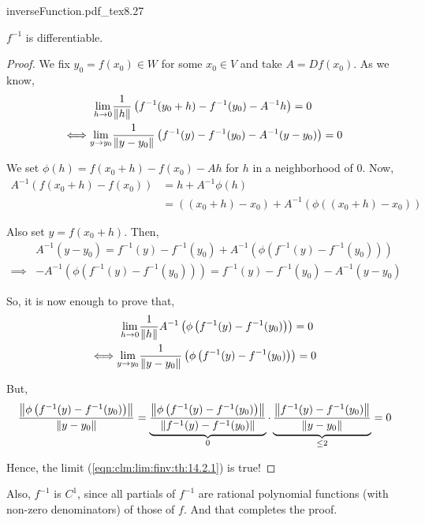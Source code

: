 \documentclass[../Analysis-3.tex]{subfiles}
\begin{document}
\begin{proofFig}{\def\svgwidth{1.4in}
    {inverseFunction.pdf_tex}}{}{\label{fig:inf:fun}}{8}{.27\textwidth}
  \begin{clmBox}
    $ f^{-1} $ is differentiable.
  \end{clmBox}

  \begin{proof}
    We fix $ y_0 = f(x_0) \in W $ for some $ x_0 \in V $ and take $ A = Df(x_0) $. As we know,
    \begin{align}
      \lim_{h \to 0}                       & \frac{1}{\norm{h}}\left( f^{-1}(y_0+h) - f^{-1}(y_0) - A^{-1}h \right)              = 0  \nonumber                  \\
      \Longleftrightarrow \lim_{y \to y_0} & \frac{1}{\norm{y-y_0}}\left( f^{-1}(y) - f^{-1}(y_0) - A^{-1}(y-y_0) \right) = 0 \label{eqn:clm:lim:finv:th:14.2.1}
    \end{align}

    We set $ \phi(h) = f(x_0+h) - f(x_0) - Ah $ for $ h $ in a neighborhood of $ 0 $. Now,
    \begin{align*}
      A^{-1}\left( f(x_0+h) - f(x_0) \right)
       & = h + A^{-1}\phi(h)                                          \\
       & = ((x_0+h) - x_0) + A^{-1}\left( \phi((x_0+h) - x_0) \right)
    \end{align*}

    Also set $ y = f(x_0+h) $. Then,
    \begin{align}
               & A^{-1}(y-y_0) = f^{-1}(y) - f^{-1}(y_0) + A^{-1}\left( \phi\left(f^{-1}(y) - f^{-1}(y_0)\right) \right)  \nonumber                                              \\
      \implies & -A^{-1}\left( \phi\left(f^{-1}(y) - f^{-1}(y_0)\right) \right) = f^{-1}(y) - f^{-1}(y_0) - A^{-1}(y-y_0)  \label{eqn:clm:limtermintermsofAinvphifinv:th:14.2.1}
    \end{align}

    So, it is now enough to prove that,
    \begin{align*}
      \lim_{h \to 0}                       & \frac{1}{\norm{h}}A^{-1}\left( \phi\left(f^{-1}(y) - f^{-1}(y_0)\right) \right)              = 0 \\
      \Longleftrightarrow \lim_{y \to y_0} & \frac{1}{\norm{y-y_0}}\left( \phi\left(f^{-1}(y) - f^{-1}(y_0)\right) \right) = 0
    \end{align*}

    But,
    \[  \frac{\norm{\phi\left(f^{-1}(y) - f^{-1}(y_0)\right)}}{\norm{y-y_0}} = \underbrace{\frac{\norm{\phi\left(f^{-1}(y) - f^{-1}(y_0)\right)}}{\norm{f^{-1}(y) - f^{-1}(y_0)}}}_{0} \cdot \underbrace{\frac{\norm{f^{-1}(y) - f^{-1}(y_0)}}{\norm{y-y_0}}}_{\leq 2} = 0  \]

    Hence, the limit (\ref{eqn:clm:lim:finv:th:14.2.1}) is true!
  \end{proof}
  Also, $ f^{-1} $ is $ C^1 $, since all partials of $ f^{-1} $ are rational polynomial functions (with non-zero denominators) of those of $ f $. And that completes the proof.
\end{proofFig}
\end{document}
